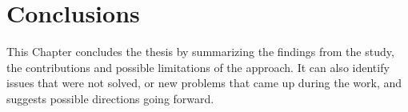 \chapter{Conclusions}
\label{chap:conclusions}

This Chapter concludes the thesis by summarizing the findings from the study, the contributions and possible limitations of the approach. It can also identify issues that were not solved, or new problems that came up during the work, and suggests possible directions going forward. \cite{Foldvik1985b}
